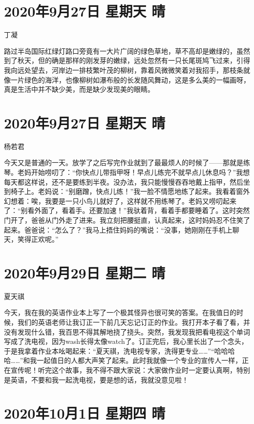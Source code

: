 \section{2020年9月27日 星期天 晴}

丁凝

路过半岛国际红绿灯路口旁竟有一大片广阔的绿色草地，草不高却是嫩绿的，虽然到了秋天，但的确是那样的刚发芽的嫩绿，远处忽然有一只长尾斑鸠飞过来，引得我向远处望去，河岸边一排枝繁叶茂的柳树，靠着风微微笑着对我招手，那枝条就像一片绿色的海洋，也像柳树如瀑布般的长发随风舞动，这是多么美的一幅画呀，真是生活中并不缺少美，而是缺少发现美的眼睛。

\section{2020年9月27日 星期天 晴}

杨若君

今天又是普通的一天。放学了之后写完作业就到了最最烦人的时候了——那就是练琴。老妈开始唠叨了：“你快点儿带指甲呀！早点儿练完不就早点儿休息吗？”我想每天都这样说，还不是要练到半夜。没办法，我只能慢慢吞吞地戴上指甲，然后坐到椅子上。老妈说：“别磨蹭，快点儿练！”我一脸不情愿地练了起来。我看着窗外幻想着：唉，我要是一只小鸟儿就好了，这样就不用练琴了。老妈又唠叨起来了：“别看外面了，看着手。还要加速！”我驮着背，看着手都要睡着了。这时突然门开了，爸爸从门外走了进来。我立刻把腰挺直，认真起来，这时妈妈忍不住笑了起来。爸爸说：“怎么了？”我马上捂住妈妈的嘴说：“没事，她刚刚在手机上聊天，笑得正欢呢。”

\section{2020年9月29日 星期二 晴}

夏天祺

今天，我在我的英语作业本上写了一个极其怪异也很可笑的答案。在我值日的时候，我们的英语老师让我订正一下前几天忘记订正的作业。我打开本子看了看，并没有发现什么错，我百思不得其解地挠了挠头。突然，我发现我把看电视这个单词写成了洗电视，因为wash长得太像watch了。订正完后，我心里长出了一个念头，于是我拿着作业本吆喝起来：“夏天祺，洗电视专家，洗得更专业……”“哈哈哈哈……”和我一起值日的人都大声笑了起来。此时我就像一个专业的宣传人一样，正在宣传呢！听完这个故事，我不得不跟大家说：大家做作业时一定要认真啊，特别是英语，不要和我一起洗电视，要是想的话，我就没意见啦！

\section{2020年10月1日 星期四 晴}

